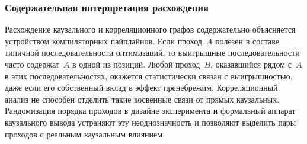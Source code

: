 \subsubsection{Содержательная интерпретация расхождения}

Расхождение каузального и корреляционного графов содержательно объясняется устройством компиляторных пайплайнов. Если проход~$A$ полезен в составе типичной последовательности оптимизаций, то выигрышные последовательности часто содержат~$A$ в одной из позиций. Любой проход~$B$, оказавшийся рядом с~$A$ в этих последовательностях, окажется статистически связан с выигрышностью, даже если его собственный вклад в эффект пренебрежим. Корреляционный анализ не способен отделить такие косвенные связи от прямых каузальных. Рандомизация порядка проходов в дизайне эксперимента и формальный аппарат каузального вывода устраняют эту неоднозначность и позволяют выделить пары проходов с реальным каузальным влиянием.

\newpage
